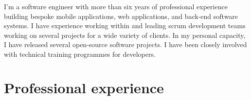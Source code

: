 \documentclass[11pt,a4paper,sans]{moderncv}
\begin{document}
\makecvtitle

\vspace{-20pt}

I'm a software engineer with more than six years of professional experience building bespoke mobile applications, web applications, and back-end software systems. I have experience working within and leading scrum development teams working on several projects for a wide variety of clients. In my personal capacity, I have released several open-source software projects. I have been closely involved with technical training programmes for developers.\\

\vspace{-12pt}

\section{Professional experience}

\vspace{3pt}
\end{document}
